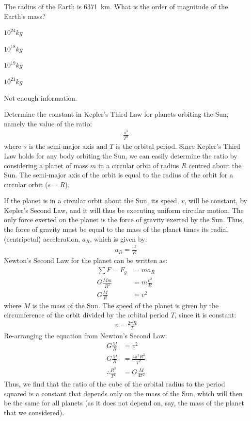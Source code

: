 \begin{checkpoint}
\begin{MCquestion}{The radius of the Earth is \SI{6371}{km}. What is the order of magnitude of the Earth's mass?}
\item $10^{24}\si{kg}$\correct
\item $10^{18}\si{kg}$
\item $10^{19}\si{kg}$
\item $10^{21}\si{kg}$
\item Not enough information.
\end{MCquestion}
\end{checkpoint}
\newpage
\begin{example}{\label{ex:gravity:keplerconstant}Determine the constant in Kepler's Third Law for planets orbiting the Sun, namely the value of the ratio:
\begin{align*}
\frac{s^3}{T^2}
\end{align*}
where $s$ is the semi-major axis and $T$ is the orbital period.
}
Since Kepler's Third Law holds for any body orbiting the Sun, we can easily determine the ratio by considering a planet of mass $m$ in a circular orbit of radius $R$ centred about the Sun. The semi-major axis of the orbit is equal to the radius of the orbit for a circular orbit ($s=R$).

If the planet is in a circular orbit about the Sun, its speed, $v$, will be constant, by Kepler's Second Law, and it will thus be executing uniform circular motion. The only force exerted on the planet is the force of gravity exerted by the Sun. Thus, the force of gravity must be equal to the mass of the planet times its radial (centripetal) acceleration, $a_R$, which is given by:
\begin{align*}
a_R=\frac{v^2}{R}
\end{align*}
Newton's Second Law for the planet can be written as:
\begin{align*}
\sum F = F_g &= ma_R\\
G\frac{Mm}{R^2}&=m\frac{v^2}{R}\\
G\frac{M}{R}&=v^2
\end{align*}
where $M$ is the mass of the Sun. The speed of the planet is given by the circumference of the orbit divided by the orbital period $T$, since it is constant:
\begin{align*}
v=\frac{2\pi R}{T}
\end{align*}
Re-arranging the equation from Newton's Second Law:
\begin{align*}
G\frac{M}{R}&=v^2\\
G\frac{M}{R}&=\frac{4\pi^2 R^2}{T^2}\\
\therefore \frac{R^3}{T^2}&=G\frac{M}{4\pi^2}
\end{align*}
Thus, we find that the ratio of the cube of the orbital radius to the period squared is a constant that depends only on the mass of the Sun, which will then be the same for all planets (as it does not depend on, say, the mass of the planet that we considered).


\end{example}
